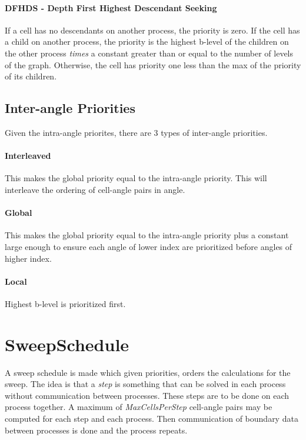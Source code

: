 \documentclass[12pt,letterpaper]{article}
\begin{document}
\paragraph{DFHDS - Depth First Highest Descendant Seeking}
If a cell has no descendants on another process, the priority is zero.
If the cell has a child on another process, the priority is the highest b-level of the children on the other process \textit{times} a constant greater than or equal to the number of levels of the graph.
Otherwise, the cell has priority one less than the max of the priority of its children.


\subsection{Inter-angle Priorities}
Given the intra-angle priorites, there are 3 types of inter-angle priorities.


\paragraph{Interleaved}
This makes the global priority equal to the intra-angle priority.
This will interleave the ordering of cell-angle pairs in angle.

\paragraph{Global}
This makes the global priority equal to the intra-angle priority plus a constant large enough to ensure each angle of lower index are prioritized before angles of higher index.

\paragraph{Local}
Highest b-level is prioritized first.



\section{SweepSchedule}
A sweep schedule is made which given priorities, orders the calculations for the sweep.
The idea is that a \textit{step} is something that can be solved in each process without communication between processes.
These steps are to be done on each process together.
A maximum of \textit{MaxCellsPerStep} cell-angle pairs may be computed for each step and each process.
Then communication of boundary data between processes is done and the process repeats.
\end{document}
